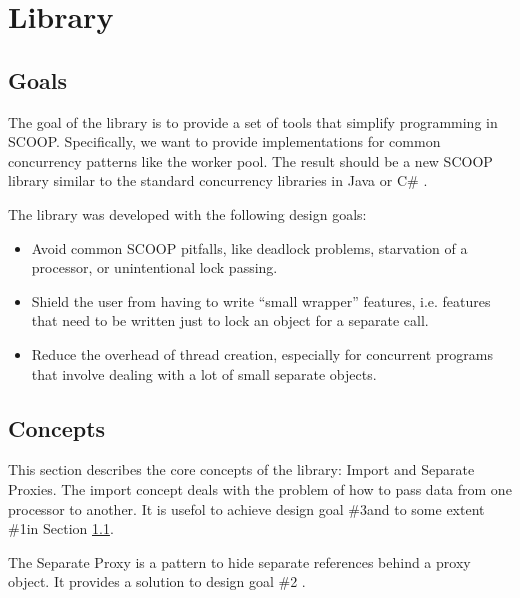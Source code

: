 \documentclass[a4paper,10pt]{article}
\newcommand{\todoref}{\todo{ref}}
\begin{document}
\section {Library}
\label{sec:library}

 
\subsection{Goals}
\label{sec:goals}

The goal of the library is to provide a set of tools that simplify programming in SCOOP.
Specifically, we want to provide implementations for common concurrency patterns like the worker pool.
The result should be a new SCOOP library similar to the standard concurrency libraries in Java \cite{web:java-concurrency} or C\# \cite{web:ms-tpl}.

The library was developed with the following design goals:

\begin{itemize}
 \item Avoid common SCOOP pitfalls, like deadlock problems, starvation of a processor, or unintentional lock passing.
 \item Shield the user from having to write ``small wrapper'' features, i.e. features that need to be written just to lock an object for a separate call.
 \item Reduce the overhead of thread creation, especially for concurrent programs that involve dealing with a lot of small separate objects.
\end{itemize}

\subsection{Concepts}

This section describes the core concepts of the library: Import and Separate Proxies.
The import concept deals with the problem of how to pass data from one processor to another.
It is usefol to achieve design goal \#3\todoref and to some extent \#1\todoref in Section \ref{sec:goals}.

The Separate Proxy is a pattern to hide separate references behind a proxy object.
It provides a solution to design goal \#2 \todoref.
\end{document}
